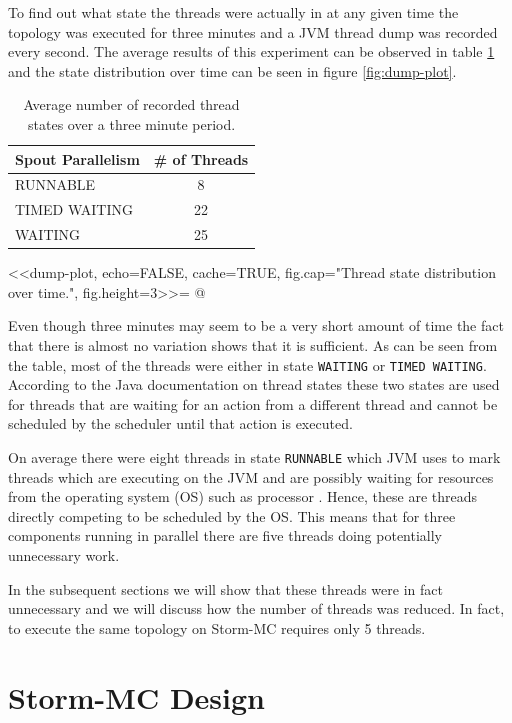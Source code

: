 To find out what state the threads were actually in at any given time the topology was executed for three minutes and a JVM thread dump was recorded every second. The average results of this experiment can be observed in table \ref{table:dump} and the state distribution over time can be seen in figure \ref{fig:dump-plot}.

\begin{table}[h!]
\centering
\begin{tabular}{@{}lc@{}}
    \textbf{Spout Parallelism} & \textbf{\# of Threads} \\ \toprule
    RUNNABLE & 8  \\
	TIMED WAITING & 22  \\
    WAITING & 25  \\
\end{tabular}
\caption{Average number of recorded thread states over a three minute period.}
\label{table:dump}
\end{table}

<<dump-plot, echo=FALSE, cache=TRUE, fig.cap="Thread state distribution over time.", fig.height=3>>=
@

Even though three minutes may seem to be a very short amount of time the fact that there is almost no variation shows that it is sufficient. As can be seen from the table, most of the threads were either in state \texttt{WAITING} or \texttt{TIMED WAITING}. According to the Java documentation on thread states \citep{JavaThreads} these two states are used for threads that are waiting for an action from a different thread and cannot be scheduled by the scheduler until that action is executed.

On average there were eight threads in state \texttt{RUNNABLE} which JVM uses to mark threads which are executing on the JVM and are possibly waiting for resources from the operating system (OS) such as processor \citep{JavaThreads}. Hence, these are threads directly competing to be scheduled by the OS. This means that for three components running in parallel there are five threads doing potentially unnecessary work.

In the subsequent sections we will show that these threads were in fact unnecessary and we will discuss how the number of threads was reduced. In fact, to execute the same topology on Storm-MC requires only 5 threads.

\section{Storm-MC Design}
\label{sec:storm_mc_arch}

